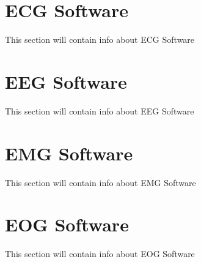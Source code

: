 \documentclass[a4paper,10pt,english,oneside]{sphinxmanual}
\begin{document}
\section{ECG Software}
\label{\detokenize{software/index:ecg-software}}\label{\detokenize{software/index:open20}}
\sphinxAtStartPar
This section will contain info about ECG Software

\begin{DUlineblock}{0em}
\item[] 
\end{DUlineblock}


\section{EEG Software}
\label{\detokenize{software/index:eeg-software}}\label{\detokenize{software/index:open21}}
\sphinxAtStartPar
This section will contain info about EEG Software

\begin{DUlineblock}{0em}
\item[] 
\end{DUlineblock}


\section{EMG Software}
\label{\detokenize{software/index:emg-software}}\label{\detokenize{software/index:open22}}
\sphinxAtStartPar
This section will contain info about EMG Software

\begin{DUlineblock}{0em}
\item[] 
\end{DUlineblock}


\section{EOG Software}
\label{\detokenize{software/index:eog-software}}\label{\detokenize{software/index:open23}}
\sphinxAtStartPar
This section will contain info about EOG Software

\begin{DUlineblock}{0em}
\item[] 
\end{DUlineblock}

\sphinxstepscope
\end{document}
